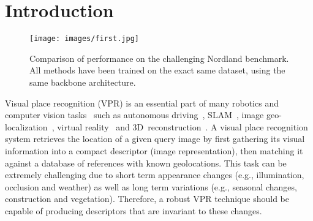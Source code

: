 \documentclass[10pt,twocolumn,letterpaper]{article}
\begin{document}
\section{Introduction}
\label{sec:intro}
\begin{figure}[t]
\begin{center}
   \texttt{[image: images/first.jpg]}
\end{center}
   \caption{Comparison of performance on the challenging Nordland benchmark. All methods have been trained on the exact same dataset, using the same backbone architecture.}
\label{fig:onecol}
\end{figure}
Visual place recognition (VPR) is an essential part of many robotics \cite{chen2017only, chen2017deep, chen2018learning, garg2019semantic, hausler2019multi, khaliq2019holistic} and computer vision tasks~\cite{arandjelovic2016netvlad, kim2017learned, liu2019stochastic, ge2020self, hausler2021patch, wang2022transvpr, berton2022rethinking} such as autonomous driving~\cite{doan2019scalable}, SLAM~\cite{yadav2022fusion}, image geo-localization~\cite{sarlin2020superglue, cao2020unifying}, virtual reality~\cite{masone2021survey} and 3D~reconstruction~\cite{liu2019lpd}. A visual place recognition system retrieves the location of a given query image by first gathering its visual information into a compact descriptor (image representation), then matching it against a database of references with known geolocations. This task can be extremely challenging due to short term appearance changes (e.g., illumination, occlusion and weather) as well as long term variations (e.g., seasonal changes, construction and vegetation). Therefore, a robust VPR technique should be capable of producing descriptors that are invariant to these changes.
\end{document}
